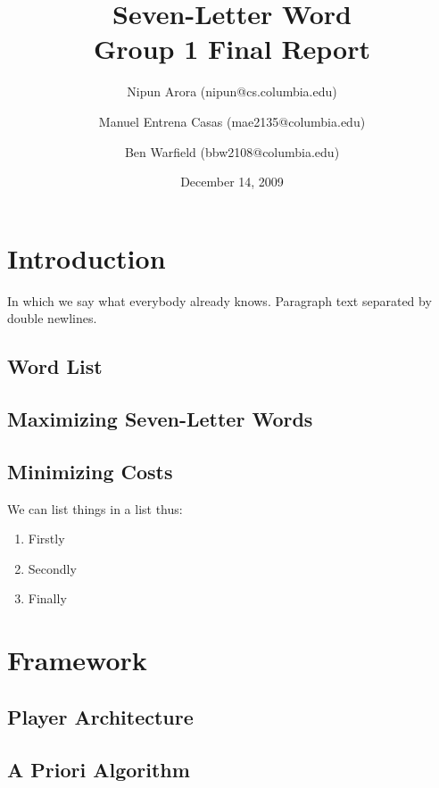 \documentclass[11pt]{article}
\begin{document}
\title{Seven-Letter Word\\Group 1 Final Report}

\author{
	Nipun Arora (nipun@cs.columbia.edu)
 \and Manuel Entrena Casas (mae2135@columbia.edu)
 \and Ben Warfield (bbw2108@columbia.edu)}

\date{December 14, 2009}
\maketitle

\newpage
\setcounter{tocdepth}{2}
\tableofcontents
\newpage

\section{ Introduction }
In which we say what everybody already knows.  Paragraph text separated by double newlines.

\subsection{Word List}
\subsection{Maximizing Seven-Letter Words}

\subsection{Minimizing Costs}

We can list things in a list thus:
\begin{enumerate}
\item Firstly
\item Secondly
\item Finally
\end{enumerate}

\section{Framework}

\subsection{Player Architecture}

\subsection{A Priori Algorithm} %
\end{document}
